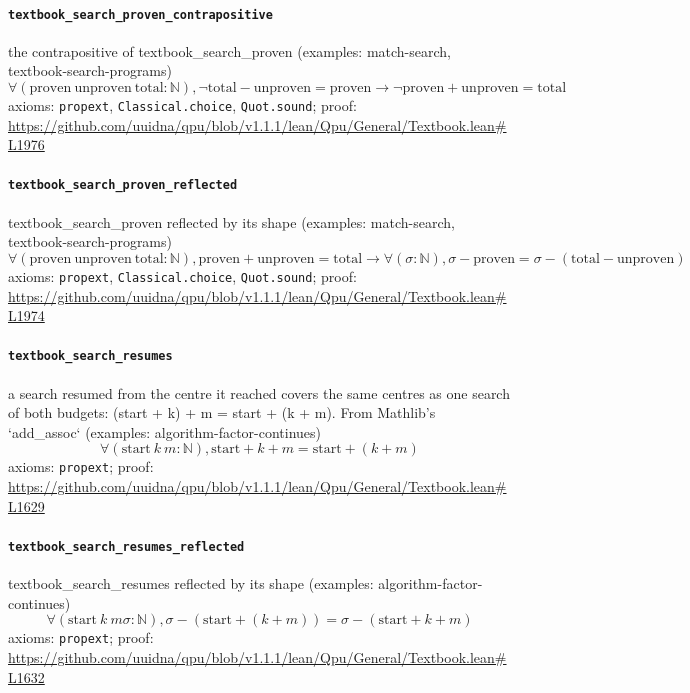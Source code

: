 \documentclass[11pt]{article}
\begin{document}
\paragraph{\texttt{textbook\_search\_proven\_contrapositive}}
the contrapositive of textbook\_search\_proven (examples: match-search, textbook-search-programs)
\[ \forall (\mathrm{proven}\ \mathrm{unproven}\ \mathrm{total} : \mathbb{N}), \neg \mathrm{total} - \mathrm{unproven} = \mathrm{proven} \to \neg \mathrm{proven} + \mathrm{unproven} = \mathrm{total} \]
\noindent axioms: \texttt{propext}, \texttt{Classical.choice}, \texttt{Quot.sound}; proof: \url{https://github.com/uuidna/qpu/blob/v1.1.1/lean/Qpu/General/Textbook.lean\#L1976}

\paragraph{\texttt{textbook\_search\_proven\_reflected}}
textbook\_search\_proven reflected by its shape (examples: match-search, textbook-search-programs)
\[ \forall (\mathrm{proven}\ \mathrm{unproven}\ \mathrm{total} : \mathbb{N}), \mathrm{proven} + \mathrm{unproven} = \mathrm{total} \to \forall (\sigma : \mathbb{N}), \sigma - \mathrm{proven} = \sigma - (\mathrm{total} - \mathrm{unproven}) \]
\noindent axioms: \texttt{propext}, \texttt{Classical.choice}, \texttt{Quot.sound}; proof: \url{https://github.com/uuidna/qpu/blob/v1.1.1/lean/Qpu/General/Textbook.lean\#L1974}

\paragraph{\texttt{textbook\_search\_resumes}}
a search resumed from the centre it reached covers the same centres as one search of both budgets: (start + k) + m = start + (k + m). From Mathlib's `add\_assoc` (examples: algorithm-factor-continues)
\[ \forall (\mathrm{start}\ k\ m : \mathbb{N}), \mathrm{start} + k + m = \mathrm{start} + (k + m) \]
\noindent axioms: \texttt{propext}; proof: \url{https://github.com/uuidna/qpu/blob/v1.1.1/lean/Qpu/General/Textbook.lean\#L1629}

\paragraph{\texttt{textbook\_search\_resumes\_reflected}}
textbook\_search\_resumes reflected by its shape (examples: algorithm-factor-continues)
\[ \forall (\mathrm{start}\ k\ m \sigma : \mathbb{N}), \sigma - (\mathrm{start} + (k + m)) = \sigma - (\mathrm{start} + k + m) \]
\noindent axioms: \texttt{propext}; proof: \url{https://github.com/uuidna/qpu/blob/v1.1.1/lean/Qpu/General/Textbook.lean\#L1632}
\end{document}
